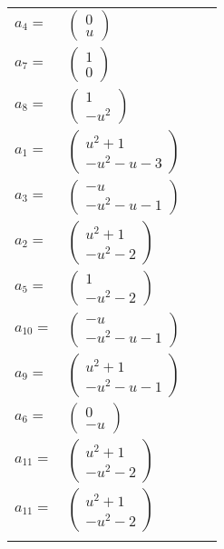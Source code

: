 \documentclass[1p]{elsarticle_modified}
\theoremstyle{definition}
\begin{document}
\begin{tabular}{m{7pt} m{180pt} m{7pt} m{180pt} }
\flushright $a_{4}=$&$\begin{pmatrix}0\\u\end{pmatrix}$ \\
\flushright $a_{7}=$&$\begin{pmatrix}1\\0\end{pmatrix}$ \\
\flushright $a_{8}=$&$\begin{pmatrix}1\\- u^2\end{pmatrix}$ \\
\flushright $a_{1}=$&$\begin{pmatrix}u^2+1\\- u^2- u-3\end{pmatrix}$ \\
\flushright $a_{3}=$&$\begin{pmatrix}- u\\- u^2- u-1\end{pmatrix}$ \\
\flushright $a_{2}=$&$\begin{pmatrix}u^2+1\\- u^2-2\end{pmatrix}$ \\
\flushright $a_{5}=$&$\begin{pmatrix}1\\- u^2-2\end{pmatrix}$ \\
\flushright $a_{10}=$&$\begin{pmatrix}- u\\- u^2- u-1\end{pmatrix}$ \\
\flushright $a_{9}=$&$\begin{pmatrix}u^2+1\\- u^2- u-1\end{pmatrix}$ \\
\flushright $a_{6}=$&$\begin{pmatrix}0\\- u\end{pmatrix}$ \\
\flushright $a_{11}=$&$\begin{pmatrix}u^2+1\\- u^2-2\end{pmatrix}$\\ \flushright $a_{11}=$&$\begin{pmatrix}u^2+1\\- u^2-2\end{pmatrix}$\\&\end{tabular}
\end{document}
